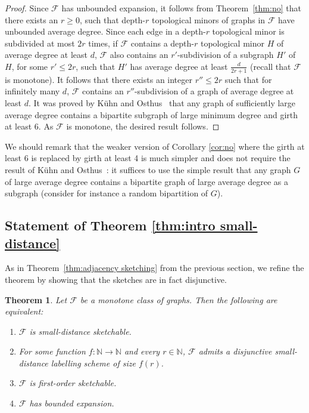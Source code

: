 \documentclass[11pt]{article}
\newtheorem{thm}{Theorem}[section]
\theoremstyle{definition}
\renewcommand{\le}{\leqslant}
\renewcommand{\ge}{\geqslant}
\def\F {{\mathcal F}}
\def\bN{{\mathbb N}}
\begin{document}
\begin{proof}
Since $\mathcal{F}$ has unbounded expansion, it follows from
Theorem~\ref{thm:no} that there exists an $r\ge 0$,
such that depth-$r$ topological minors of graphs in $\mathcal{F}$ have unbounded
average degree. Since each edge in a depth-$r$ topological minor is
subdivided at most $2r$ times, if $\mathcal{F}$ contains a depth-$r$
topological minor $H$ of average degree at least $d$, $\mathcal{F}$
also contains an $r'$-subdivision of a subgraph $H'$ of $H$, for some
$r'\le 2r$, such that $H'$ has average degree at least
$\tfrac{d}{2r+1}$ (recall that $\mathcal{F}$ is  monotone). It follows
that there exists an integer $r''\le 2r$ such that for infinitely many
$d$, $\mathcal{F}$
contains an $r''$-subdivision of a graph of average degree at least
$d$. It was proved by K\"uhn and Osthus~\cite{KO04} that any graph of
sufficiently  large average degree
contains a bipartite subgraph of large minimum
degree and girth at least 6. As $\mathcal{F}$ is  monotone, the desired result follows.
\end{proof}

We should remark that the weaker version of Corollary \ref{cor:no} where the
girth at least 6 is replaced by girth at least 4 is much simpler and
does not require the result of K\"uhn and Osthus~\cite{KO04}: it
suffices to use the simple result that any graph $G$ of large average
degree contains a bipartite graph of large average degree as a
subgraph (consider for instance a random bipartition of $G$).

\subsection{Statement of Theorem \ref{thm:intro small-distance}}
\label{section:small-distance-theorem}

As in Theorem~\ref{thm:adjacency sketching} from the previous section, we refine the theorem by
showing that the sketches are in fact disjunctive.

\begin{thm}
\label{thm:small-distance sketching}
Let $\F$ be a monotone class of graphs. Then the following are equivalent:
\begin{enumerate}
\item $\F$ is small-distance sketchable.
\item For some function $f : \bN \to \bN$ and every $r \in \bN$, $\F$ admits a disjunctive
small-distance labelling scheme of size $f(r)$.
\item $\F$ is first-order sketchable. 
\item $\F$ has bounded expansion.
\end{enumerate}
\end{thm}
\end{document}
